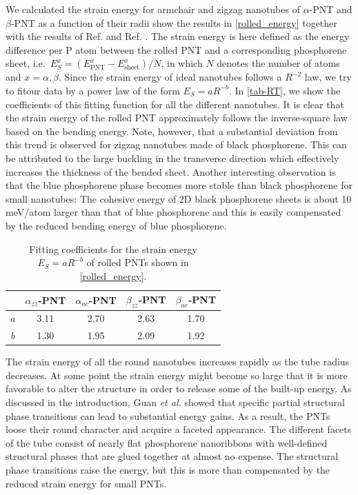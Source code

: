 We calculated the strain energy for armchair and zigzag nanotubes of $\alpha$-PNT and $\beta$-PNT as a function of their radii show the results in \autoref{rolled_energy} together with the results of Ref. \cite{Guan2014a} and Ref. \cite{Guo2014}. The strain energy is here defined as the energy difference per P atom between the rolled PNT and a corresponding phosphorene sheet, i.e.~$E^{x}_S=(E_{\text{PNT}}^{x}-E_{\text{sheet}}^{x})/N$, in which $N$ denotes the number of atoms and $x=\alpha,\beta$. Since the strain energy of ideal nanotubes follows a $R^{-2}$ law, we try to fitour data by a power law of the form $E_S=aR^{-b}$. In \autoref{tab-RT}, we show the coefficients of this fitting function for all the different nanotubes. It is clear that the strain energy of the rolled PNT approximately follows the inverse-square law based on the bending energy. Note, however, that a substantial deviation from this trend is observed for zigzag nanotubes made of black phosphorene. This can be attributed to the large buckling in the transverse direction which effectively increases the thickness of the bended sheet. Another interesting observation is that the blue phosphorene phase becomes more stable than black phosphorene for small nanotubes: The cohesive energy of 2D black phosphorene sheets is about 10 meV/atom larger than that of blue phosphorene\cite{Guan2014a} and this is easily compensated by the reduced bending energy of blue phosphorene. 

\begin{table}[htb] \centering
\caption{Fitting coefficients for the strain energy $E_S=aR^{-b}$ of rolled PNTs shown in \autoref{rolled_energy}.\label{tab-RT}}
\begin{tabular}{c|cccc}
\hline\hline    
        & $\alpha_{zz}$-PNT  & $\alpha_{ac}$-PNT  & $\beta_{zz}$-PNT   & $\beta_{ac}$-PNT \\
\hline
$a$			&   3.11   &   2.70  &   2.63   &   1.70  \\ 
$b$		  &   1.30   &   1.95   &   2.09   &   1.92  \\
\hline\hline
\end{tabular}
\end{table}

The strain energy of all the round nanotubes increases rapidly as the tube radius decreases. At some point the strain energy might become so large that it is more favorable to alter the structure in order to release some of the built-up energy. As discussed in the introduction, Guan \textit{et al.}\cite{Guan2014a} showed that specific partial structural phase transitions can lead to substantial energy gains. As a result, the PNTs loose their round character and acquire a faceted appearance. The different facets of the tube consist of nearly flat phosphorene nanoribbons with well-defined structural phases that are glued together at almost no expense. The structural phase transitions raise the energy, but this is more than compensated by the reduced strain energy for small PNTs. 

